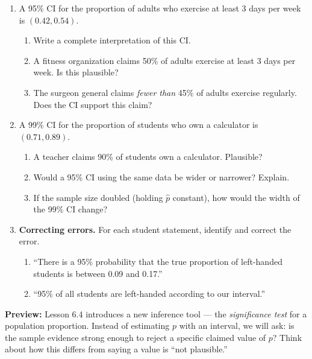 \documentclass[10pt]{article}
\begin{document}
\namedateperiod

\vspace{0.15in}

\begin{enumerate}

  \item A 95\% CI for the proportion of adults who exercise at least 3 days per week is
        $(0.42, 0.54)$.
        \begin{enumerate}[label=\alph*.]
          \item Write a complete interpretation of this CI. 
          \item A fitness organization claims 50\% of adults exercise at least 3 days per week.
                Is this plausible? 
          \item The surgeon general claims \emph{fewer than} 45\% of adults exercise regularly.
                Does the CI support this claim? 
        \end{enumerate}

  \item A 99\% CI for the proportion of students who own a calculator is $(0.71, 0.89)$.
        \begin{enumerate}[label=\alph*.]
          \item A teacher claims 90\% of students own a calculator. Plausible? 
          \item Would a 95\% CI using the same data be wider or narrower? Explain.
          \item If the sample size doubled (holding $\hat p$ constant), how would the width of
                the 99\% CI change? 
        \end{enumerate}

  \item \textbf{Correcting errors.} For each student statement, identify and correct the error.
        \begin{enumerate}[label=\alph*.]
          \item ``There is a 95\% probability that the true proportion of left-handed students
                is between 0.09 and 0.17.'' 
          \item ``95\% of all students are left-handed according to our interval.'' 
        \end{enumerate}

\end{enumerate}

\begin{reflectionbox}
\textbf{Preview:} Lesson 6.4 introduces a new inference tool --- the \emph{significance test} for
a population proportion. Instead of estimating $p$ with an interval, we will ask: is the sample
evidence strong enough to reject a specific claimed value of $p$? Think about how this differs
from saying a value is ``not plausible.''
\end{reflectionbox}
\end{document}
